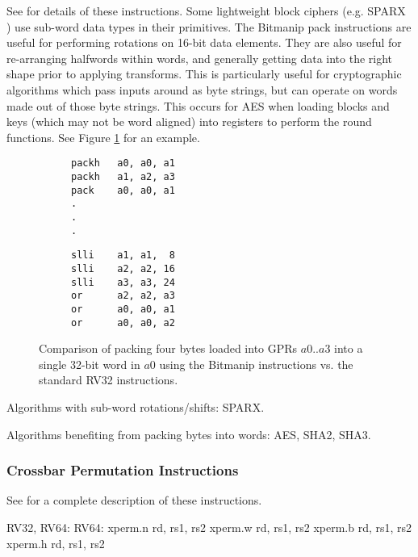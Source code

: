 See \cite[Section 2.1.4]{riscv:bitmanip:draft} for details of
these instructions.
Some lightweight block ciphers
(e.g. SPARX \cite{DPUVGB:16})
use sub-word data types in their primitives.
The Bitmanip pack instructions are useful for performing rotations on
16-bit data elements.
They are also useful for re-arranging halfwords within words, and
generally getting data into the right shape prior to applying transforms.
This is particularly useful for cryptographic algorithms which pass inputs
around as byte strings, but can operate on words made out of those byte
strings.
This occurs for AES when loading blocks and keys (which may not be
word aligned) into registers to perform the round functions.
See Figure \ref{fig:example:pack} for an example.

\begin{figure}
\begin{subfigure}[t]{0.5\textwidth}
\begin{lstlisting}
packh   a0, a0, a1
packh   a1, a2, a3
pack    a0, a0, a1
.
.
.
\end{lstlisting}
\end{subfigure}
\begin{subfigure}[t]{0.5\textwidth}
\begin{lstlisting}
slli    a1, a1,  8
slli    a2, a2, 16
slli    a3, a3, 24
or      a2, a2, a3
or      a0, a0, a1
or      a0, a0, a2
\end{lstlisting}
\end{subfigure}
\caption{Comparison of packing four bytes loaded into GPRs $a0..a3$ into
a single 32-bit word in $a0$ using the Bitmanip \mnemonic[pack*] instructions
vs. the standard RV32 instructions.}
\label{fig:example:pack}
\end{figure}

Algorithms with sub-word rotations/shifts:
SPARX.

Algorithms benefiting from packing bytes into words:
AES, SHA2, SHA3.


\subsubsection{Crossbar Permutation Instructions}

See \cite[Section 2.2.4]{riscv:bitmanip:draft} for a complete
description of these instructions.

\begin{cryptobitmanipisa}
RV32, RV64:                         RV64:
    xperm.n rd, rs1, rs2                xperm.w   rd, rs1, rs2
    xperm.b rd, rs1, rs2
    xperm.h rd, rs1, rs2
\end{cryptobitmanipisa}

